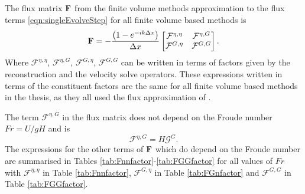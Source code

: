 The flux matrix $\mathbf{F}$ from the finite volume methods approximation to the flux terms \eqref{eqn:singleEvolveStep} for all finite volume based methods is
\begin{equation}
 \mathbf{F} = - \dfrac{\left(1 - e^{-ik\Delta x}\right)}{ \Delta x}\begin{bmatrix}
 \mathcal{F}^{\eta,\eta} & \mathcal{F}^{\eta,G} \\\mathcal{F}^{G,\eta} &\mathcal{F}^{G,G}
 \end{bmatrix}.
 \label{eqn:APPFlux}
\end{equation}
Where $\mathcal{F}^{\eta,\eta} $, $\mathcal{F}^{\eta,G} $, $\mathcal{F}^{G,\eta} $, $\mathcal{F}^{G,G} $ can be written in terms of factors given by the reconstruction and the velocity solve operators. These expressions written in terms of the constituent factors are the same for all finite volume based methods in the thesis, as they all used the flux approximation of \citet{Kurganov-etal-2001-707}.

The term $\mathcal{F}^{\eta,G}$ in the flux matrix does not depend on the Froude number $Fr = U/ gH$ and is
\[\mathcal{F}^{\eta,G} = H \mathcal{G}^G. \]
The expressions for the other terms of $\mathbf{F}$ which do depend on the Froude number are summarised in Tables \ref{tab:Fnnfactor}-\ref{tab:FGGfactor} for all values of $Fr$ with $\mathcal{F}^{\eta,\eta}$ in Table \ref{tab:Fnnfactor}, $\mathcal{F}^{G,\eta}$ in Table \ref{tab:FGnfactor} and $\mathcal{F}^{G,G}$ in Table \ref{tab:FGGfactor}.



